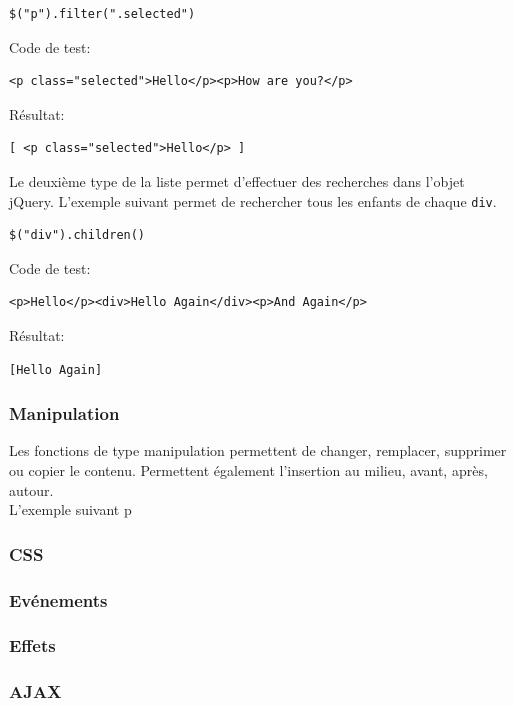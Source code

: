 \documentclass[10pt,a4paper,titlepage]{article}
\begin{document}
\begin{lstlisting}
$("p").filter(".selected")
\end{lstlisting}

Code de test:
\begin{lstlisting}
<p class="selected">Hello</p><p>How are you?</p>
\end{lstlisting}

Résultat:
\begin{lstlisting}
[ <p class="selected">Hello</p> ]
\end{lstlisting}

Le deuxième type de la liste permet d'effectuer des recherches dans l'objet jQuery. L'exemple suivant permet de rechercher tous les enfants de chaque \texttt{div}.

\begin{lstlisting}
$("div").children()
\end{lstlisting}


Code de test:
\begin{lstlisting}
<p>Hello</p><div>Hello Again</div><p>And Again</p>
\end{lstlisting}


Résultat:
\begin{lstlisting}
[Hello Again]
\end{lstlisting}

\subsubsection{Manipulation}
Les fonctions de type manipulation permettent de changer, remplacer, supprimer ou copier le contenu. Permettent également l'insertion au milieu, avant, après, autour.\\

L'exemple suivant p

\subsubsection{CSS}
\subsubsection{Evénements}
\subsubsection{Effets}
\subsubsection{AJAX}
\end{document}
